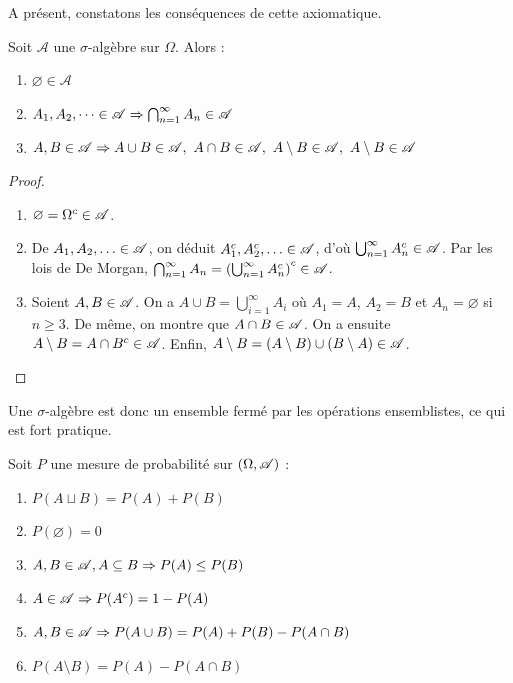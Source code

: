 
A présent, constatons les conséquences de cette axiomatique.

\begin{proposition}
    Soit $\mathscr A$ une $\sigma$-algèbre sur $\Omega$. Alors :
    \begin{enumerate}
        \item $\varnothing \in \mathscr A$
        \item $A_1,A_2,\dots \in \mathscr A \Rightarrow \bigcap_{n=1}^{\infty} A_n \in \mathscr A$ 
        \item $A,B\in \mathscr A \alors A\cup B\in \mathscr A,\ A\cap B \in \mathscr A,\ A\setminus B \in \mathscr A,\ A\setminus B\in \mathscr A$
    \end{enumerate}
\end{proposition}

\begin{proof}
    \begin{enumerate}
        \item $\varnothing = \Omega^c \in \mathscr{A}$.
        \item De $A_1,A_2,\dotsc\in\mathscr{A}$, on déduit $A_1^c,A_2^c,\dotsc\in\mathscr{A}$, d'où $\bigcup_{n=1}^\infty A_n^c\in\mathscr{A}$. Par les lois de De Morgan, $\bigcap_{n=1}^\infty A_n = \left(\bigcup_{n=1}^\infty A^c_n\right)^c\in\mathscr{A}$.
        \item Soient $A,B\in \mathscr{A}$. On a $A\cup B= \bigcup_{i=1}^\infty A_i$ où $A_1=A$, $A_2=B$ et $A_n= \varnothing$ si $n\ge 3$. De même, on montre que $A\cap B\in\mathscr{A}$. On a ensuite $A\setminus B = A\cap B^c \in \mathscr{A}$. Enfin, $A\setminus B = (A\setminus B)\cup (B\setminus A) \in \mathscr{A}$.
    \end{enumerate}
\end{proof}

Une $\sigma$-algèbre est donc un ensemble fermé par les opérations ensemblistes, ce qui est fort pratique.

\begin{proposition}
    Soit $P$ une mesure de probabilité sur $(\Omega, \mathscr{A})$ :
    \begin{enumerate}
        \item $P(A\sqcup B) = P(A)+P(B)$
        \item $P(\varnothing)=0$
        \item $A,B\in \mathscr A, A\subseteq B \Rightarrow P(A) \leq P(B)$
        \item $A\in \mathscr{A} \Rightarrow P(A^c)= 1- P(A)$
        \item $A,B\in \mathscr{A} \Rightarrow P(A\cup B)= P(A)+P(B)-P(A\cap B)$
        \item $P(A\setminus B)= P(A)- P(A\cap B)$
    \end{enumerate}
\end{proposition}

